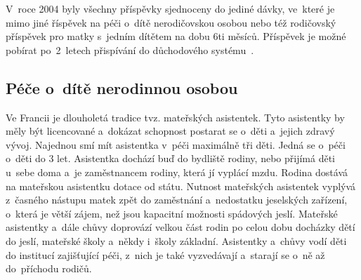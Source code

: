 				V roce 2004 byly všechny příspěvky sjednoceny do jediné dávky, ve které je mimo jiné říspěvek na péči o~dítě nerodičovskou osobou nebo též rodičovský příspěvek pro matky s~jedním dítětem na dobu 6ti měsíců. Příspěvek je možné pobírat po 2 letech přispívání do důchodového systému~\citep{Dennipece}.

			\subsection{Péče o~dítě nerodinnou osobou}
				Ve Francii je dlouholetá tradice tvz. mateřských asistentek. Tyto asistentky by měly být licencované a~dokázat schopnost postarat se o~děti a~jejich zdravý vývoj. Najednou smí mít asistentka v~péči maximálně tři děti. Jedná se o~péči o~děti do 3 let. Asistentka dochází buď do bydliště rodiny, nebo přijímá děti u~sebe doma a~je zaměstnancem rodiny, která jí vyplácí mzdu. Rodina dostává na mateřskou asistentku dotace od státu.
				Nutnost mateřských asistentek vyplývá z časného nástupu matek zpět do zaměstnání a nedostatku jeselských zařízení, o~která je větší zájem, než jsou kapacitní možnosti spádových jeslí. Mateřské asistentky a~dále chůvy doprovází velkou část rodin po celou dobu docházky dětí do jeslí, mateřské školy a~někdy i~školy základní. Asistentky a~chůvy vodí děti do institucí zajišťující péči, z~nich je také vyzvedávají a~starají se o~ně až do příchodu rodičů.
